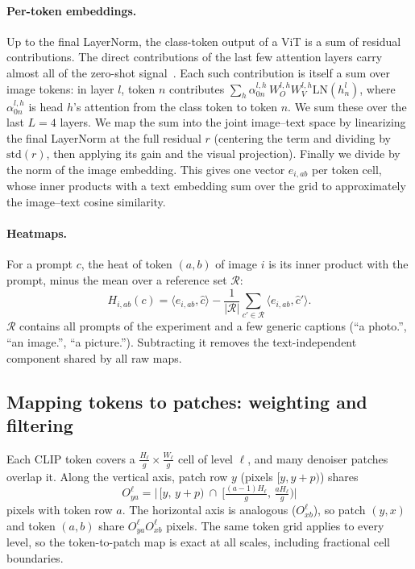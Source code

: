 \paragraph{Per-token embeddings.}
Up to the final LayerNorm, the class-token output of a ViT is a sum of residual contributions. The direct contributions of the last few attention layers carry almost all of the zero-shot signal~\cite{gandelsman2024interpreting}. Each such contribution is itself a sum over image tokens: in layer $l$, token $n$ contributes
$\sum_h \alpha^{l,h}_{0n}\, W_O^{l,h} W_V^{l,h} \mathrm{LN}(h^{l}_n)$, where $\alpha^{l,h}_{0n}$ is head $h$'s attention from the class token to token $n$. We sum these over the last $L=4$ layers. We map the sum into the joint image--text space by linearizing the final LayerNorm at the full residual $r$ (centering the term and dividing by $\mathrm{std}(r)$, then applying its gain and the visual projection). Finally we divide by the norm of the image embedding. This gives one vector $e_{i,ab}$ per token cell, whose inner products with a text embedding sum over the grid to approximately the image--text cosine similarity.

\paragraph{Heatmaps.}
For a prompt $c$, the heat of token $(a,b)$ of image $i$ is its inner product with the prompt, minus the mean over a reference set $\mathcal R$:
\begin{equation}
  H_{i,ab}(c) = \langle e_{i,ab},\hat c\rangle - \frac{1}{|\mathcal R|}\sum_{c'\in\mathcal R}\langle e_{i,ab},\hat c'\rangle .
\end{equation}
$\mathcal R$ contains all prompts of the experiment and a few generic captions (``a photo.'', ``an image.'', ``a picture.''). Subtracting it removes the text-independent component shared by all raw maps.

\subsection{Mapping tokens to patches: weighting and filtering}
\label{sec:filter}

Each CLIP token covers a $\frac{H_\ell}{g}\times\frac{W_\ell}{g}$ cell of level $\ell$, and many denoiser patches overlap it. Along the vertical axis, patch row $y$ (pixels $[y,y+p)$) shares
\begin{equation}
  O^{\ell}_{ya} = \Big|\,[y,\,y+p)\ \cap\ \big[\tfrac{(a-1)H_\ell}{g},\,\tfrac{aH_\ell}{g}\big)\Big|
\end{equation}
pixels with token row $a$. The horizontal axis is analogous ($O^{\ell}_{xb}$), so patch $(y,x)$ and token $(a,b)$ share $O^{\ell}_{ya}O^{\ell}_{xb}$ pixels. The same token grid applies to every level, so the token-to-patch map is exact at all scales, including fractional cell boundaries.

